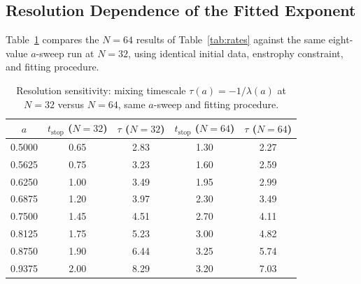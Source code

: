 \documentclass[12pt,a4paper]{article}
\theoremstyle{definition}
\theoremstyle{plain}
\begin{document}
\subsection{Resolution Dependence of the Fitted Exponent}

Table~\ref{tab:resolution} compares the $N=64$ results of
Table~\ref{tab:rates} against the same eight-value $a$-sweep run at
$N=32$, using identical initial data, enstrophy constraint, and fitting
procedure.

\begin{table}[H]
  \centering
  \caption{%
    Resolution sensitivity: mixing timescale $\tau(a)=-1/\lambda(a)$ at
    $N=32$ versus $N=64$, same $a$-sweep and fitting procedure.
  }
  \label{tab:resolution}
  \begin{tabular}{ccccc}
    \toprule
    $a$ & $t_{\text{stop}}$ ($N{=}32$) & $\tau$ ($N{=}32$)
        & $t_{\text{stop}}$ ($N{=}64$) & $\tau$ ($N{=}64$) \\
    \midrule
    0.5000 & 0.65 & 2.83 & 1.30 & 2.27 \\
    0.5625 & 0.75 & 3.23 & 1.60 & 2.59 \\
    0.6250 & 1.00 & 3.49 & 1.95 & 2.99 \\
    0.6875 & 1.20 & 3.97 & 2.30 & 3.49 \\
    0.7500 & 1.45 & 4.51 & 2.70 & 4.11 \\
    0.8125 & 1.75 & 5.23 & 3.00 & 4.82 \\
    0.8750 & 1.90 & 6.44 & 3.25 & 5.74 \\
    0.9375 & 2.00 & 8.29 & 3.20 & 7.03 \\
    \bottomrule
  \end{tabular}
\end{table}
\end{document}
